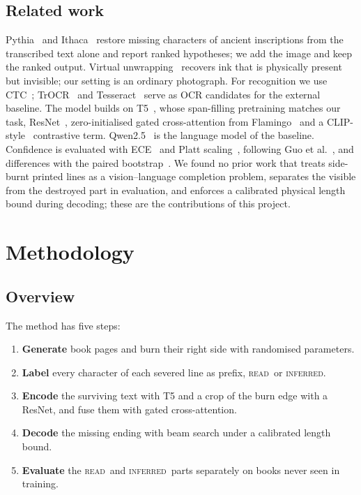 \documentclass[12pt,a4paper,oneside]{report}
\newcommand{\READ}{\texorpdfstring{\textsc{read}}{READ}}
\newcommand{\INF}{\texorpdfstring{\textsc{inferred}}{INFERRED}}
\begin{document}
\section{Related work}
Pythia~\cite{assael2019pythia} and Ithaca~\cite{assael2022ithaca} restore missing characters of
ancient inscriptions from the transcribed text alone and report ranked hypotheses; we add the
image and keep the ranked output. Virtual unwrapping~\cite{seales2016engedi} recovers ink that is
physically present but invisible; our setting is an ordinary photograph. For recognition we use
CTC~\cite{graves2006ctc}; TrOCR~\cite{li2023trocr} and Tesseract~\cite{smith2007tesseract} serve as
OCR candidates for the external baseline. The model builds on T5~\cite{raffel2020t5}, whose
span-filling pretraining matches our task, ResNet~\cite{he2016resnet}, zero-initialised gated
cross-attention from Flamingo~\cite{alayrac2022flamingo} and a CLIP-style~\cite{radford2021clip}
contrastive term. Qwen2.5~\cite{qwen2024} is the language model of the baseline. Confidence is
evaluated with ECE~\cite{naeini2015ece} and Platt scaling~\cite{platt1999}, following
Guo et al.~\cite{guo2017calibration}, and differences with the paired
bootstrap~\cite{efron1993bootstrap}. We found no prior work that treats side-burnt printed lines
as a vision--language completion problem, separates the visible from the destroyed part in
evaluation, and enforces a calibrated physical length bound during decoding; these are the
contributions of this project.

\chapter{Methodology}\label{ch:method}
\section{Overview}
The method has five steps:
\begin{enumerate}[leftmargin=2em,itemsep=1pt]
\item \textbf{Generate} book pages and burn their right side with randomised parameters.
\item \textbf{Label} every character of each severed line as prefix, \READ\ or \INF.
\item \textbf{Encode} the surviving text with T5 and a crop of the burn edge with a ResNet, and fuse
them with gated cross-attention.
\item \textbf{Decode} the missing ending with beam search under a calibrated length bound.
\item \textbf{Evaluate} the \READ\ and \INF\ parts separately on books never seen in training.
\end{enumerate}
\end{document}
